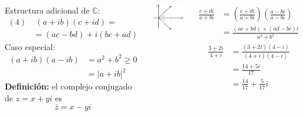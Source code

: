 \documentclass[9pt, aspectratio=169]{beamer}
\begin{document}
\begin{frame}
	\begin{columns}[t]
		Estructura adicional de $\mathbb{C}$:
		\begin{align*}
			(4) & \; (a + ib)(c + id) =     \\
			    & = (ac - bd) + i (bc + ad)
		\end{align*}
		Caso especial:
		\begin{align*}
			(a + ib)(a - ib) & = a^2 + b^2 \geq 0 \\
			                 & = |a + i b|^2
		\end{align*}
		\textbf{Definición:} el complejo conjugado de $z = x + y i$ es
		\[ \bar{z} = x - y i \]
		\begin{center}
			\includegraphics[scale=0.25]{figs/conjugado.pdf}
		\end{center}

		\begin{align*}
			\frac{c + di}{a + bi} & = \left(\frac{c + di}{a + bi}\right) \left(\frac{a - bi}{a - bi}\right) \\
			                      & = \frac{(ac + bd) + (ad - bc)i}{a^2 + b^2}
		\end{align*}
		\begin{align*}
			\frac{3 + 2 i}{4 + i} & = \frac{(3 + 2i)(4 - i)}{(4 + i)(4 - i)} \\
			                      & = \frac{14 + 5 i}{17}                    \\
			                      & = \frac{14}{17} + \frac{5}{17}i
		\end{align*}


\end{columns}
\end{frame}
\end{document}
